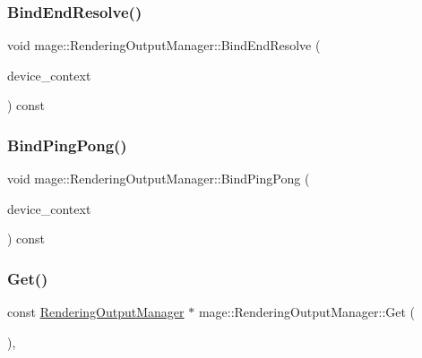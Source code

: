 \subsubsection{\texorpdfstring{Bind\+End\+Resolve()}{BindEndResolve()}}
{\footnotesize\ttfamily void mage\+::\+Rendering\+Output\+Manager\+::\+Bind\+End\+Resolve (\begin{DoxyParamCaption}\item[{I\+D3\+D11\+Device\+Context4 $\ast$}]{device\+\_\+context }\end{DoxyParamCaption}) const\hspace{0.3cm}{\ttfamily [noexcept]}}

\hypertarget{classmage_1_1_rendering_output_manager_a3e35046ac247c08aab2a9631b1beef7d}{}\label{classmage_1_1_rendering_output_manager_a3e35046ac247c08aab2a9631b1beef7d} 
\subsubsection{\texorpdfstring{Bind\+Ping\+Pong()}{BindPingPong()}}
{\footnotesize\ttfamily void mage\+::\+Rendering\+Output\+Manager\+::\+Bind\+Ping\+Pong (\begin{DoxyParamCaption}\item[{I\+D3\+D11\+Device\+Context4 $\ast$}]{device\+\_\+context }\end{DoxyParamCaption}) const\hspace{0.3cm}{\ttfamily [noexcept]}}

\hypertarget{classmage_1_1_rendering_output_manager_afc3d9dcc274a281e26110f6b43ec6c62}{}\label{classmage_1_1_rendering_output_manager_afc3d9dcc274a281e26110f6b43ec6c62} 
\subsubsection{\texorpdfstring{Get()}{Get()}}
{\footnotesize\ttfamily const \hyperlink{classmage_1_1_rendering_output_manager}{Rendering\+Output\+Manager} $\ast$ mage\+::\+Rendering\+Output\+Manager\+::\+Get (\begin{DoxyParamCaption}{ }\end{DoxyParamCaption})\hspace{0.3cm}{\ttfamily [static]}, {\ttfamily [noexcept]}}

